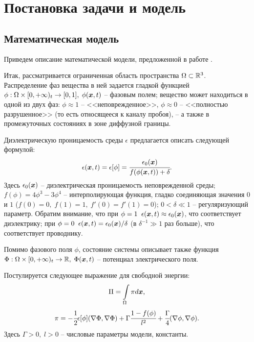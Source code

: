 
\section{Постановка задачи и модель}

\subsection{Математическая модель}

Приведем описание математической модели, предложенной в работе \cite{pitike_dielectric_breakdown}.

Итак, рассматривается ограниченная область пространства $\Omega \subset {\mathbb{R}}^3$. Распределение фаз вещества в ней задается гладкой функцией $\phi: \Omega \times [0, +\infty)_t \to [0, 1], \; \phi({\boldsymbol{x}}, t)$ -- фазовым полем; вещество может находиться в одной из двух фаз: $\phi \approx 1$ -- <<неповрежденное>>, $\phi \approx 0$ -- <<полностью разрушенное>> (то есть относящееся к каналу пробоя), -- а также в промежуточных состояниях в зоне диффузной границы.

Диэлектрическую проницаемость среды $\epsilon$ предлагается описать следующей формулой:
\begin{equation}
    \epsilon({\boldsymbol{x}}, t) = \epsilon[\phi] = \cfrac{\epsilon_0({\boldsymbol{x}})}{f(\phi({\boldsymbol{x}}, t)) + \delta} \text{.}
    \label{equation_epsilon}
\end{equation}
Здесь $\epsilon_0({\boldsymbol{x}})$ -- диэлектрическая проницаемость неповрежденной среды; $f(\phi) = 4\phi^3 - 3\phi^4$ -- интерполирующая функция, гладко соединяющая значения $0$ и $1$ ($f(0) = 0, \; f(1) = 1, \; f'(0) = f'(1) = 0$); $0 < \delta \ll 1$ -- регуляризующий параметр. Обратим внимание, что при $\phi = 1 \;\; \epsilon({\boldsymbol{x}}, t) \approx \epsilon_0({\boldsymbol{x}})$, что соответствует диэлектрику; при $\phi = 0 \;\; \epsilon({\boldsymbol{x}}, t) = \epsilon_0({\boldsymbol{x}}) / \delta$ (в $\delta^{-1} \gg 1$ раз больше), что соответствует проводнику.

Помимо фазового поля $\phi$, состояние системы описывает также функция $\Phi: \Omega \times [0, +\infty)_t \to {\mathbb{R}}, \; \Phi({\boldsymbol{x}}, t)$ -- потенциал электрического поля.

Постулируется следующее выражение для свободной энергии:
\begin{equation}
    \Pi = \int \limits_\Omega \pi d {\boldsymbol{x}} \text{,}
    \label{equation_free_energy}
\end{equation}
\begin{equation}
    \pi = -\cfrac{1}{2} \epsilon[\phi] (\nabla \Phi, \nabla \Phi) + \Gamma \cfrac{1 - f(\phi)}{l^2} + \cfrac{\Gamma}{4} (\nabla \phi, \nabla \phi) \text{.}
    \label{equation_free_energy_density}
\end{equation}
Здесь $\Gamma > 0, \; l > 0$ -- числовые параметры модели, константы.

